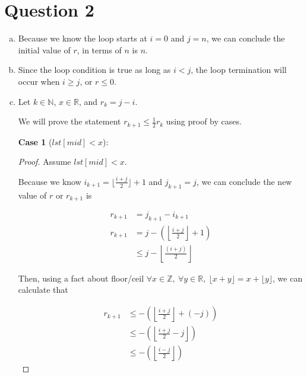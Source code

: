 \documentclass[12pt]{article}
\begin{document}
\section*{Question 2}
\begin{enumerate}[a.]
    \item
    Because we know the loop starts at $ i = 0$ and $j = n$, we can conclude the
    initial value of $r$, in terms of $n$ is $n$.

    \item
    Since the loop condition is true as long as $i < j$, the loop termination will
    occur when $i \geq j$, or $r \leq 0$.

    \item

    Let $k \in \mathbb{N}$, $x \in \mathbb{R}$, and $r_k = j - i$.

    \bigskip

    We will prove the statement $r_{k+1} \leq \frac{1}{2} r_k$ using proof by cases.

    \bigskip

    \textbf{Case 1} ($lst[mid] < x$):

    \bigskip

    \begin{proof}
        Assume $lst[mid] < x$.

        \bigskip

        Because we know $i_{k+1} = \lfloor \frac{i + j}{2} \rfloor + 1$
        and $j_{k+1} = j$, we can conclude the new value of $r$ or $r_{k+1}$ is

        \setcounter{equation}{0}
        \begin{align}
            r_{k+1} &= j_{k+1}  - i_{k+1}\\
            r_{k+1} &= j - \left( \left\lfloor \frac{i+j}{2} \right\rfloor + 1 \right)\\
            &\leq j - \left\lfloor \frac{(i+j)}{2} \right\rfloor
        \end{align}

        \bigskip

        Then, using a fact about floor/ceil $\forall x \in \mathbb{Z},\:\forall y \in
        \mathbb{R},\:\lfloor x+y \rfloor = x + \lfloor y \rfloor$, we can calculate that

        \begin{align}
            r_{k+1} &\leq - \left( \left\lfloor \frac{i + j}{2} \right\rfloor + (-j) \right)\\
            &\leq - \left( \left\lfloor \frac{i + j}{2} - j \right\rfloor \right)\\
            &\leq - \left( \left\lfloor \frac{i - j}{2} \right\rfloor \right)
        \end{align}


\end{proof}
\end{enumerate}
\end{document}
